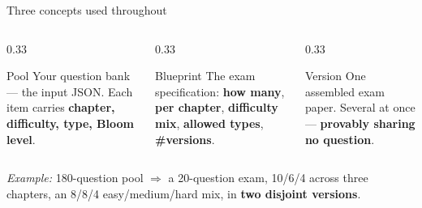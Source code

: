 \documentclass[11pt,aspectratio=169]{beamer}
\begin{document}
\begin{frame}{Three concepts used throughout}
  \begin{columns}[T]
    \begin{column}{0.33\textwidth}
      \begin{block}{Pool}
        Your question bank — the input JSON. Each item carries
        \textbf{chapter, difficulty, type, Bloom level}.
      \end{block}
    \end{column}
    \begin{column}{0.33\textwidth}
      \begin{block}{Blueprint}
        The exam specification: \textbf{how many}, \textbf{per chapter},
        \textbf{difficulty mix}, \textbf{allowed types}, \textbf{\#versions}.
      \end{block}
    \end{column}
    \begin{column}{0.33\textwidth}
      \begin{block}{Version}
        One assembled exam paper. Several at once — \textbf{provably sharing no
        question}.
      \end{block}
    \end{column}
  \end{columns}

  \vspace{4mm}
  \begin{center}\small
  \emph{Example:} 180-question pool $\Rightarrow$ a 20-question exam,
  10/6/4 across three chapters, an 8/8/4 easy/medium/hard mix,
  in \textbf{two disjoint versions}.
  \end{center}
\end{frame}
\end{document}
